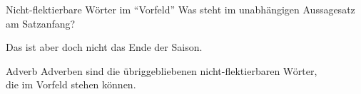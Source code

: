\begin{frame}
  {Nicht-flektierbare Wörter im "`Vorfeld"'}
  \pause
  Was steht im unabhängigen Aussagesatz am Satzanfang?\\
  \pause
  {}
  \pause
  \begin{exe}
    \ex\label{ex:adverbenadkopulasundpartikeln038}
    \begin{xlist}
      \pause
      \pause
      \pause
      \pause
      \pause
      \pause
      \pause
      \pause
      \pause
      \pause
    \end{xlist}
    \ex\label{ex:adverbenadkopulasundpartikeln044} Das ist aber \alert{doch} nicht das Ende der Saison.
  \end{exe}
  \pause
  \Viertelzeile
  \begin{block}{Adverb}
    Adverben sind die übriggebliebenen nicht-flektierbaren Wörter,\\
    die im Vorfeld stehen können.
  \end{block}
\end{frame}



